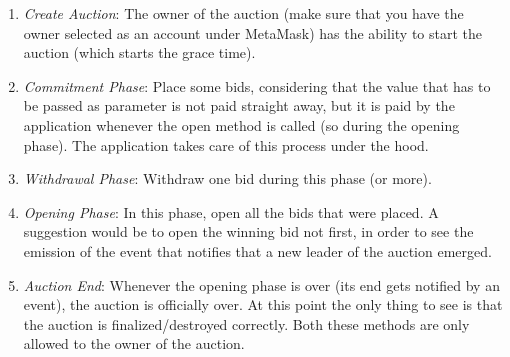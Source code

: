 \documentclass[11pt, a4paper]{report}
\begin{document}
	\begin{enumerate}
		\item \emph{Create Auction}: The owner of the auction (make sure that you have the owner selected as an account under MetaMask) has the ability to start the auction (which starts the grace time). 
		\item \emph{Commitment Phase}: Place some bids, considering that the value that has to be passed as parameter is not paid straight away, but it is paid by the application whenever the open method is called (so during the opening phase). The application takes care of this process under the hood. 
		\item \emph{Withdrawal Phase}: Withdraw one bid during this phase (or more).
		\item \emph{Opening Phase}: In this phase, open all the bids that were placed. A suggestion would be to open the winning bid not first, in order to see the emission of the event that notifies that a new leader of the auction emerged.
		\item \emph{Auction End}: Whenever the opening phase is over (its end gets notified by an event), the auction is officially over. At this point the only thing to see is that the auction is finalized/destroyed correctly. Both these methods are only allowed to the owner of the auction.
	\end{enumerate}
\end{document}
